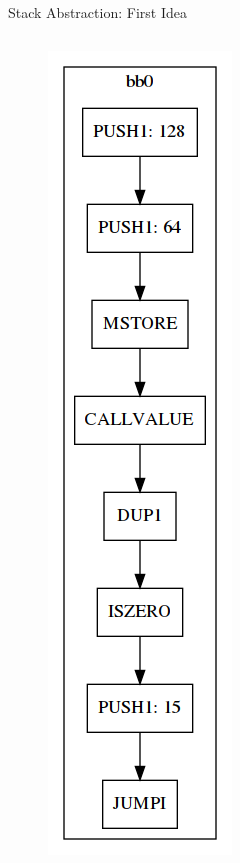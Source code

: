 \documentclass[11pt]{beamer}
\begin{document}
\begin{frame}{Stack Abstraction: First Idea}
\begin{columns}
{\begin{figure}
    \includegraphics[scale=0.25]{figures/cfg_normalBB0.png}
\end{figure}
}
\end{columns}
\end{frame}
\end{document}
